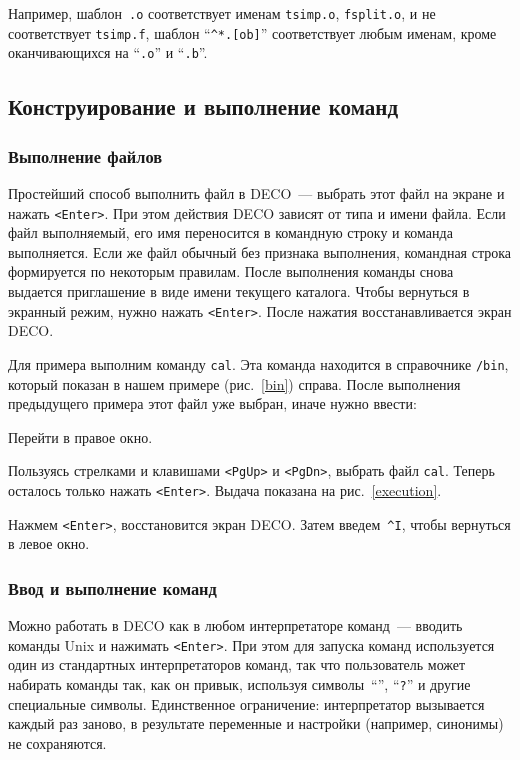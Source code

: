 Например, шаблон~{\tt *.o} соответствует именам {\tt tsimp.o}, {\tt fsplit.o},
и не соответствует {\tt tsimp.f}, шаблон ``{\tt \^{}*.[ob]}'' соответствует любым
именам, кроме оканчивающихся на ``{\tt .o}'' и ``{\tt .b}''.

\subsection{Конструирование и выполнение команд}

\subsubsection{Выполнение файлов}

Простейший способ выполнить файл в DECO~--- выбрать этот файл на экране и
нажать {\tt <Enter>}. При этом действия DECO зависят от типа и имени файла.
Если файл выполняемый, его имя переносится в командную строку и
команда выполняется. Если же файл обычный без признака выполнения,
командная строка формируется по некоторым правилам. После выполнения команды
снова выдается приглашение в виде имени текущего каталога.
Чтобы вернуться в экранный режим, нужно нажать {\tt <Enter>}.
После нажатия восстанавливается экран DECO.

Для примера выполним команду {\tt cal}. Эта команда
находится в справочнике {\tt /bin}, который показан в нашем
примере (рис.~\ref{bin}) справа. После выполнения предыдущего
примера этот файл уже выбран, иначе нужно ввести:

\begin{example}
Перейти в правое окно.
\end{example}

Пользуясь стрелками и клавишами {\tt <PgUp>} и {\tt <PgDn>}, выбрать файл
{\tt cal}. Теперь осталось только нажать {\tt <Enter>}.
Выдача показана на рис.~\ref{execution}.


Нажмем {\tt <Enter>}, восстановится экран DECO.
Затем введем~{\tt \^{}I}, чтобы вернуться в левое окно.

\subsubsection{Ввод и выполнение команд}

Можно работать в DECO как в любом интерпретаторе команд~---
вводить команды Unix и нажимать {\tt <Enter>}. При этом для
запуска команд используется один из стандартных интерпретаторов
команд, так что пользователь может набирать команды так, как он привык,
используя символы~``{\tt *}'', ``{\tt ?}'' и другие специальные символы.
Единственное ограничение: интерпретатор вызывается каждый раз заново,
в результате переменные и настройки (например, синонимы) не сохраняются.

